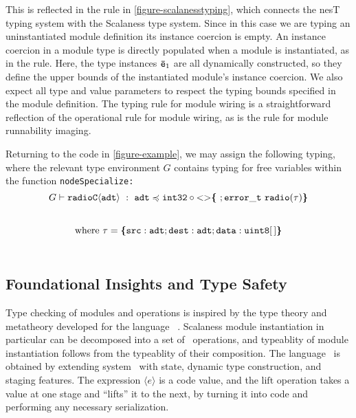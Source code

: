 This is reflected in the  rule in
\autoref{figure-scalanesstyping}, which connects the nesT typing
system with the Scalaness type system. Since in this case we are
typing an uninstantiated module definition its instance coercion is
empty.  An instance coercion in a module type is directly populated
when a module is instantiated, as in the  rule.
Here, the type instances ${\mathtt{\bar{e}}}_1$ are all dynamically
constructed, so they define the upper bounds of the instantiated
module's instance coercion. We also expect all type and value
parameters to respect the typing bounds specified in the module
definition. 
The  typing rule for module wiring is a
straightforward reflection of the operational rule for module wiring,
as is the  rule for module runnability
imaging.
\begin{example}
\label{example-scalanesstyping}
Returning to the code in \autoref{figure-example}, we may assign the
following typing, where the relevant type environment $G$ contains 
typing for free variables within the function \tt{nodeSpecialize}:
$$
  G \vdash \mathtt{radioC\langle adt \rangle}\ :\  
    \mathtt{adt} \preccurlyeq \mathtt{int32} \circ \mathrm{<}\mathrm{>}\textup{\textbf{\{}}\ ;
      \mathtt{error\_t\ radio(\tau)} \textup{\textbf{\}}}
$$
$$
\text{where}\ \tau = \textup{\textbf{\{}} \mathtt{src : adt}; \mathtt{dest : adt}; \mathtt{data : uint8[\,]} \textup{\textbf{\}}} 
$$
\end{example}

\subsection{Foundational Insights and Type Safety} 
\label{section-framedml}

Type checking of modules and operations is inspired by the type theory
and metatheory developed for the language \fml\ \cite{FramedML}. Scalaness
module instantiation in particular can be decomposed into a set of
\fml\ operations, and typeablity of module instantiation follows from
the typeablity of their composition. The language \fml\ is obtained by
extending system \fsub\ with state, dynamic type construction, and
staging features. The expression $\langle e \rangle$ is a code value,
and the $\mathrm{lift}$ operation takes a value at one stage
and ``lifts'' it to the next, by turning it into code and performing
any necessary serialization.

